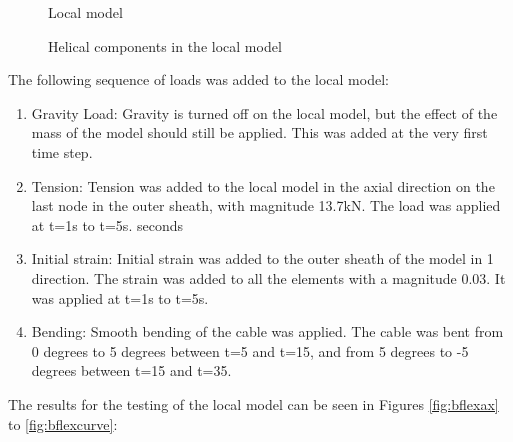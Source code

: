 \begin{figure}[H]
\hfill
{}\hfill
\caption{Local model}
\label{fig:volt}
\end{figure}

\begin{figure}[H]
\hfill
{}\hfill
\caption{Helical components in the local model}
\label{fig:volt}
\end{figure}
 \noindent The following sequence of loads was added to the local model:
\begin{enumerate}
    \item Gravity Load: Gravity is turned off on the local model, but the effect of the mass of the model should still be applied. This was added at the very first time step.
    \item Tension: Tension was added to the local model in the axial direction on the last node in the outer sheath, with magnitude 13.7kN. The load was applied at t=1s to t=5s. seconds
    \item Initial strain: Initial strain was added to the outer sheath of the model in 1 direction. The strain was added to all the elements with a magnitude 0.03. It was applied at t=1s to t=5s.
    \item Bending: Smooth bending of the cable was applied. The cable was bent from 0 degrees to 5 degrees between t=5 and t=15, and from 5 degrees to -5 degrees between t=15 and t=35.  
\end{enumerate}
\noindent The results for the testing of the local model can be seen in Figures \ref{fig:bflexax} to \ref{fig:bflexcurve}:





 



